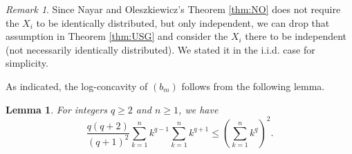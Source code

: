 \documentclass[10pt]{article}
\newcommand{\1}{\textbf{1}}
\newtheorem{lemma}[theorem]{Lemma}
\theoremstyle{remark}
\newtheorem{remark}[theorem]{Remark}
\theoremstyle{definition}
\begin{document}
\begin{remark}\label{rem:iid-USG}
Since Nayar and Oleszkiewicz's Theorem \ref{thm:NO} does not require the $X_i$ to be identically distributed, but only independent, we can drop that assumption in Theorem \ref{thm:USG} and consider the $X_i$ there to be independent (not necessarily identically distributed). We stated it in the i.i.d. case for simplicity.
\end{remark}

As indicated, the log-concavity of $(b_m)$ follows from the following lemma.

\begin{lemma}\label{lm:log-conc-sums}
For integers $q \geq 2$ and $n \geq 1$, we have
\[
\frac{q(q+2)}{(q+1)^2}\sum_{k=1}^n k^{q-1} \sum_{k=1}^n k^{q+1} \leq \left(\sum_{k=1}^n k^q\right)^2.
\]
\end{lemma}
\end{document}
